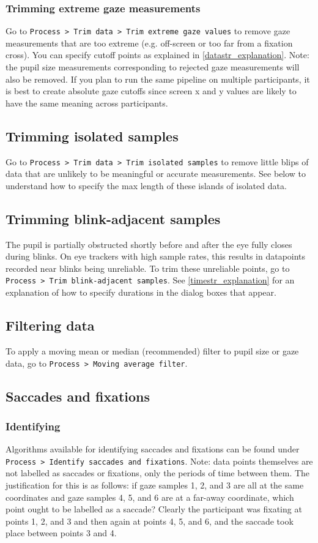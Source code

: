 \documentclass{article}
\begin{document}
\subsubsection{Trimming extreme gaze measurements}
Go to \texttt{Process > Trim data > Trim extreme gaze values} to remove gaze measurements that are too extreme (e.g. off-screen or too far from a fixation cross). You can specify cutoff points as explained in \ref{datastr_explanation}. Note: the pupil size measurements corresponding to rejected gaze measurements will also be removed. If you plan to run the same pipeline on multiple participants, it is best to create absolute gaze cutoffs since screen x and y values are likely to have the same meaning across participants.
\subsection{Trimming isolated samples}
Go to \texttt{Process > Trim data > Trim isolated samples} to remove little blips of data that are unlikely to be meaningful or accurate measurements. See below to understand how to specify the max length of these islands of isolated data.
\subsection{Trimming blink-adjacent samples}
The pupil is partially obstructed shortly before and after the eye fully closes during blinks. On eye trackers with high sample rates, this results in datapoints recorded near blinks being unreliable. To trim these unreliable points, go to \texttt{Process > Trim blink-adjacent samples}. See \ref{timestr_explanation} for an explanation of how to specify durations in the dialog boxes that appear.
\subsection{Filtering data}
To apply a moving mean or median (recommended) filter to pupil size or gaze data, go to \texttt{Process > Moving average filter}.
\subsection{Saccades and fixations}
\subsubsection{Identifying}
Algorithms available for identifying saccades and fixations can be found under \texttt{Process > Identify saccades and fixations}. Note: data points themselves are not labelled as saccades or fixations, only the periods of time between them. The justification for this is as follows: if gaze samples 1, 2, and 3 are all at the same coordinates and gaze samples 4, 5, and 6 are at a far-away coordinate, which point ought to be labelled as a saccade? Clearly the participant was fixating at points 1, 2, and 3 and then again at points 4, 5, and 6, and the saccade took place between points 3 and 4.
\end{document}

